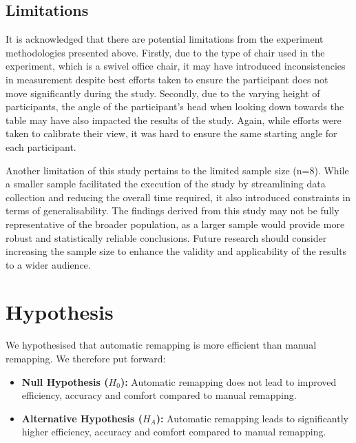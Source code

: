 \documentclass{l4proj}
\begin{document}
\subsection{Limitations}
It is acknowledged that there are potential limitations from the experiment methodologies presented above. Firstly, due to the type of chair used in the experiment, which is a swivel office chair, it may have introduced inconsistencies in measurement despite best efforts taken to ensure the participant does not move significantly during the study. Secondly, due to the varying height of participants, the angle of the participant's head when looking down towards the table may have also impacted the results of the study. Again, while efforts were taken to calibrate their view, it was hard to ensure the same starting angle for each participant.

Another limitation of this study pertains to the limited sample size (n=8). While a smaller sample facilitated the execution of the study by streamlining data collection and reducing the overall time required, it also introduced constraints in terms of generalisability. The findings derived from this study may not be fully representative of the broader population, as a larger sample would provide more robust and statistically reliable conclusions. Future research should consider increasing the sample size to enhance the validity and applicability of the results to a wider audience.


\section{Hypothesis}
We hypothesised that automatic remapping is more efficient than manual remapping. We therefore put forward:

\begin{itemize}
    \item \textbf{Null Hypothesis ($H_0$):} Automatic remapping does not lead to improved efficiency, accuracy and comfort compared to manual remapping. 
    \item \textbf{Alternative Hypothesis ($H_A$):} Automatic remapping leads to significantly higher efficiency, accuracy and comfort compared to manual remapping.

\end{itemize}
\end{document}
